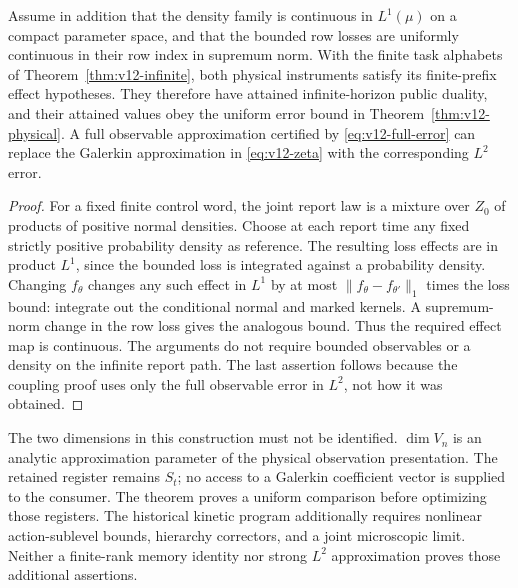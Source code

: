\begin{corollary}
\label{cor:v12-physical-duality}
Assume in addition that the density family is continuous in $L^1(\mu)$
on a compact parameter space, and that the bounded row losses are
uniformly continuous in their row index in supremum norm. With the
finite task alphabets of Theorem~\ref{thm:v12-infinite}, both physical
instruments satisfy its finite-prefix effect hypotheses. They therefore
have attained infinite-horizon public duality, and their attained values
obey the uniform error bound in Theorem~\ref{thm:v12-physical}.
A full observable approximation certified by
\eqref{eq:v12-full-error} can replace the Galerkin approximation in
\eqref{eq:v12-zeta} with the corresponding $L^2$ error.
\end{corollary}

\begin{proof}
For a fixed finite control word, the joint report law is a mixture over
$Z_0$ of products of positive normal densities. Choose at each report time
any fixed strictly positive probability density as reference. The
resulting loss effects are in product $L^1$, since the bounded loss is
integrated against a probability density. Changing $f_\theta$ changes
any such effect in $L^1$ by at most $\|f_\theta-f_{\theta'}\|_1$ times
the loss bound: integrate out the conditional normal and marked kernels.
A supremum-norm change in the row loss gives the analogous bound.
Thus the required effect map is continuous. The arguments do not require
bounded observables or a density on the infinite report path. The last
assertion follows because the coupling proof uses only the full
observable error in $L^2$, not how it was obtained.
\end{proof}

The two dimensions in this construction must not be identified.
$\dim V_n$ is an analytic approximation parameter of the physical
observation presentation. The retained register remains $S_t$; no access
to a Galerkin coefficient vector is supplied to the consumer. The theorem
proves a uniform comparison before optimizing those registers. The
historical kinetic program additionally requires nonlinear action-sublevel
bounds, hierarchy correctors, and a joint microscopic limit. Neither a
finite-rank memory identity nor strong $L^2$ approximation proves those
additional assertions.
